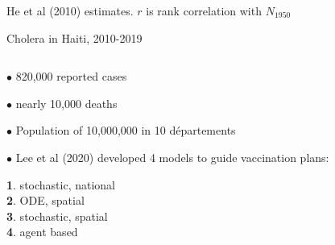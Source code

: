\documentclass{beamer}
\begin{document}
\begin{frame}{He et al (2010) estimates. $r$ is rank correlation with $N_{1950}$}
\end{frame}


\begin{frame}{Cholera in Haiti, 2010-2019}

  

  
\begin{columns}[T] %

\begin{column}{.35\textwidth}
  \vspace{2mm}
  
  $\bullet$  820,000 reported cases

  \vspace{4mm}
  
  $\bullet$ nearly 10,000 deaths

    \vspace{4mm}

$\bullet$  Population of 10,000,000 in 10 d\'{e}partements

    \vspace{4mm}
    
    $\bullet$  Lee et al (2020) developed 4 models to guide vaccination plans:

    
    \vspace{1mm}
    
    {\bf 1}. stochastic, national \\
    {\bf 2}. ODE, spatial \\
    {\bf 3}. stochastic, spatial\\
    {\bf 4}. agent based


\end{column}
\end{columns}
\end{frame}
\end{document}
